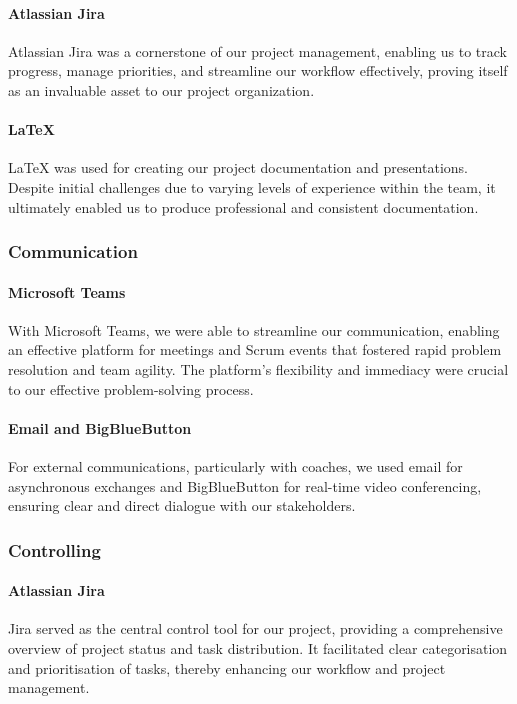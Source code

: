\paragraph{Atlassian Jira}
Atlassian Jira was a cornerstone of our project management, enabling us to track progress, manage priorities, and streamline our workflow effectively, proving itself as an invaluable asset to our project organization.

\paragraph{LaTeX}
LaTeX was used for creating our project documentation and presentations.
Despite initial challenges due to varying levels of experience within the team, it ultimately enabled us to produce professional and consistent documentation.

\subsubsection{Communication}

\paragraph{Microsoft Teams}
With Microsoft Teams, we were able to streamline our communication, enabling an effective platform for meetings and Scrum events that fostered rapid problem resolution and team agility.
The platform's flexibility and immediacy were crucial to our effective problem-solving process.

\paragraph{Email and BigBlueButton}
For external communications, particularly with coaches, we used email for asynchronous exchanges and BigBlueButton for real-time video conferencing, ensuring clear and direct dialogue with our stakeholders.

\subsubsection{Controlling}

\paragraph{Atlassian Jira}
Jira served as the central control tool for our project, providing a comprehensive overview of project status and task distribution.
It facilitated clear categorisation and prioritisation of tasks, thereby enhancing our workflow and project management.


